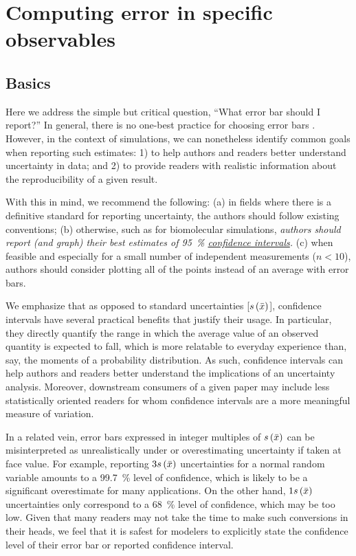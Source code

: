 \section{Computing error in specific observables}
\label{sec:specific}

\subsection{Basics}

Here we address the simple but critical question, ``What error bar should I report?''
In general, there is no one-best practice for choosing error bars \cite{Nicholls2014}. However, in the context of simulations, we can nonetheless identify common goals when reporting such estimates: 1) to help authors and readers better understand uncertainty in data; and 2) to provide readers with realistic information about the reproducibility of a given result.

With this in mind, we recommend the following: (a) in fields where there is a definitive standard for reporting uncertainty, the authors should follow existing conventions; (b) otherwise, such as for biomolecular simulations, \emph{authors should report (and graph) their best estimates of 95~\% \hyperref[def:conf_int]{confidence intervals}.}
(c) when feasible and especially for a small number of independent measurements ($n < 10$), authors should consider plotting all of the points instead of an average with error bars.

We emphasize that as opposed to standard uncertainties [$s\left( \bar{x} \right)$], confidence intervals have several practical benefits that justify their usage. In particular, they directly quantify the range in which the average value of an observed quantity is expected to fall, which is more relatable to everyday experience than, say, the moments of a probability distribution. As such, confidence intervals can help authors and readers better understand the implications of an uncertainty analysis. Moreover, downstream consumers of a given paper may include less statistically oriented readers for whom confidence intervals are a more meaningful measure of variation.

In a related vein, error bars expressed in integer multiples of $s\left( \bar{x} \right)$ can be misinterpreted as unrealistically under or overestimating uncertainty if taken at face value. For example, reporting $3s\left( \bar{x} \right)$ uncertainties for a normal random variable amounts to a 99.7~\% level of confidence, which is likely to be a significant overestimate for many applications. On the other hand, $1s\left( \bar{x} \right)$ uncertainties only correspond to a 68~\% level of confidence, which may be too low. Given that many readers may not take the time to make such conversions in their heads, we feel that it is safest for modelers to explicitly state the confidence level of their error bar or reported confidence interval.

